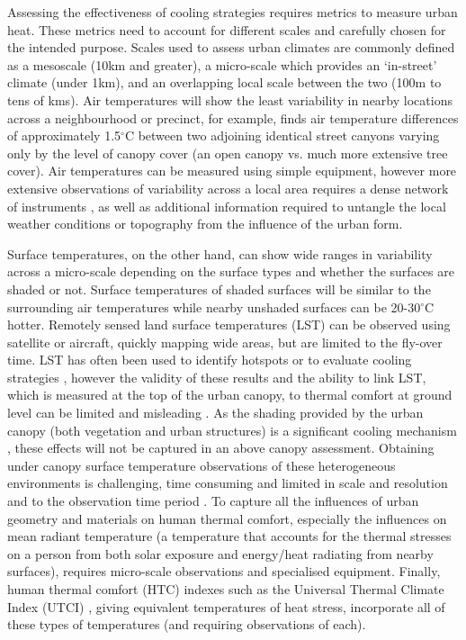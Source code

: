 \documentclass[final,3p,times,authoryear]{elsarticle}
\begin{document}
Assessing the effectiveness of cooling strategies requires metrics to measure urban heat. These metrics need to account for different scales and carefully chosen for the intended purpose. Scales used to assess urban climates are commonly defined \citep{Oke2017} as a mesoscale (10km and greater), a micro-scale which provides an `in-street' climate (under 1km), and an overlapping local scale between the two (100m to tens of kms). Air temperatures will show the least variability in nearby locations across a neighbourhood or precinct, for example, \cite{Coutts2015} finds air temperature differences of approximately 1.5$^{\circ}$C between two adjoining identical street canyons varying only by the level of canopy cover (an open canopy vs. much more extensive tree cover). Air temperatures can be measured using simple equipment, however more extensive observations of variability across a local area requires a dense network of instruments \citep{Potgieter2021}, as well as additional information required to untangle the local weather conditions or topography from the influence of the urban form. 

Surface temperatures, on the other hand, can show wide ranges in variability across a micro-scale depending on the surface types and whether the surfaces are shaded or not. Surface temperatures of shaded surfaces will be similar to the surrounding air temperatures while nearby unshaded surfaces can be 20-30$^{\circ}$C hotter. Remotely sensed land surface temperatures (LST) can be observed using satellite or aircraft, quickly mapping wide areas, but are limited to the fly-over time. LST has often been used to identify hotspots \citep{Aniello1995} or to evaluate cooling strategies \citep{Zhu2012a,Duncan2018,Manoli2019,Ossola2021}, however the validity of these results and the ability to link LST, which is measured at the top of the urban canopy, to thermal comfort at ground level can be limited and misleading \citep{Coutts2016d}. As the shading provided by the urban canopy (both vegetation and urban structures) is a significant cooling mechanism \citep{Coutts2015,Lee2018,Krayenhoff2021}, these effects will not be captured in an above canopy assessment. Obtaining under canopy surface temperature observations of these heterogeneous environments is challenging, time consuming and limited in scale and resolution and to the observation time period \citep{Middel2019a}. To capture all the influences of urban geometry and materials on human thermal comfort, especially the influences on mean radiant temperature \citep{Kantor2011} (a temperature that accounts for the thermal stresses on a person from both solar exposure and energy/heat radiating from nearby surfaces), requires micro-scale observations and specialised equipment. Finally, human thermal comfort (HTC) indexes such as the Universal Thermal Climate Index (UTCI) \citep{Brode2012a}, giving equivalent temperatures of heat stress, incorporate all of these types of temperatures (and requiring observations of each).
\end{document}
